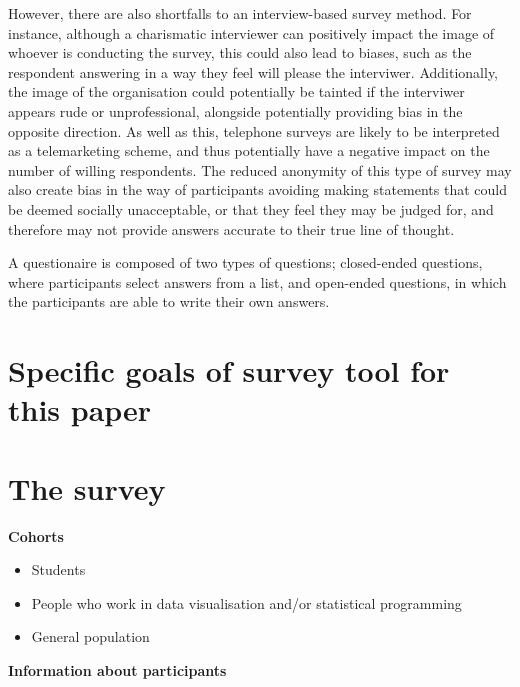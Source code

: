 However, there are also shortfalls to an interview-based survey method. For instance, although a charismatic interviewer can 
positively impact the image of whoever is conducting the survey, this could also lead to biases, such as the respondent 
answering in a way they feel will please the interviwer.
Additionally, the image of the organisation could potentially be tainted if the interviwer appears rude or unprofessional, 
alongside potentially providing bias in the opposite direction. As well as this, telephone surveys are likely to be 
interpreted as a telemarketing scheme, and thus potentially have a negative impact on the number of willing respondents.
The reduced anonymity of this type of survey may also create bias in the way of participants avoiding making statements
that could be deemed socially unacceptable, or that they feel they may be judged for, and therefore may not provide answers
accurate to their true line of thought.





A questionaire is composed of two types of questions; closed-ended questions, where participants select answers from a list,
and open-ended questions, in which the participants are able to write their own answers. 



\section{Specific goals of survey tool for this paper}


\section{The survey}

\textbf{Cohorts}
\begin{itemize}
    \item Students
    \item People who work in data visualisation and/or statistical programming
    \item General population
\end{itemize}



\textbf{Information about participants}

